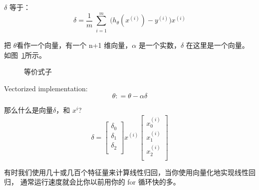\documentclass[UTF8]{ctexart}
\begin{document}
$\delta$ 等于：
\begin{equation*}
\delta=
\frac{1}{m}
\sum^m_{\substack{i=1}}
 \Big(h_\theta(x^{(i)})-y^{(i)}\Big)x^{(i)}
\end{equation*}

把 $\theta$看作一个向量，有一个 n+1 维向量，$\alpha$ 是一个实数，$\delta$ 在这里是一个向量。
如图~\ref{fig:43}所示。
\begin{figure}[H]
 \caption{等价式子}
 \label{fig:43}
\end{figure}

Vectorized implementation:
\begin{equation*}
\theta : = \theta - \alpha \delta
\end{equation*}

那么什么是向量$\delta$，和 $x^{i}$?
\begin{equation*}
  \delta=
  \begin{bmatrix}
     \delta_{0} \\
     \delta_{1} \\
     \delta_{2} \\
  \end{bmatrix}
  x^{(i)}
\begin{bmatrix}
  x_{0}^{(i)} \\
   x_{1}^{(i)} \\
   x_{2}^{(i)} \\
\end{bmatrix}
\end{equation*}

有时我们使用几十或几百个特征量来计算线性归回，当你使用向量化地实现线性回归，
通常运行速度就会比你以前用你的 for 循环快的多。
\end{document}

